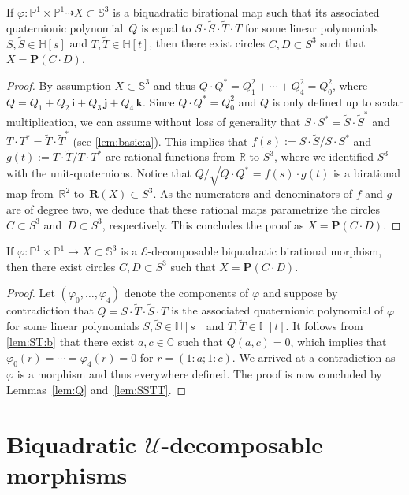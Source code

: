 \documentclass[11pt]{article}
\newcommand{\RL}[2]{\Cref{lem:#1}\ref{lem:#1:#2}}
\newcommand{\C}{\mathbb{C}}
\newcommand{\R}{\mathbb{R}}
\renewcommand{\H}{\mathbb{H}}
\renewcommand{\P}{\mathbb{P}}
\renewcommand{\S}{\mathbb{S}}
\newcommand{\bP}{\mathbf{P}}
\newcommand{\bR}{\mathbf{R}}
\newcommand{\cE}{\mathcal{E}}
\newcommand{\cU}{\mathcal{U}}
\newcommand{\tS}{\tilde{S}}
\newcommand{\tT}{\tilde{T}}
\newcommand{\qi}{\mathbf{i}}
\newcommand{\qj}{\mathbf{j}}
\newcommand{\qk}{\mathbf{k}}
\renewcommand{\c}{\colon}
\newcommand{\dto}{\dasharrow}
\newcommand{\Wlog}{without loss of generality }
\newcommand{\resp}{respectively}
\newcommand{\st}{such that }
\begin{document}
\begin{lemma}
\label{lem:SSTT}
If $\varphi\c\P^1\times\P^1\dto X\subset \S^3$ is a
biquadratic birational map \st its associated quaternionic polynomial~$Q$
is equal to $S\cdot\tS\cdot\tT\cdot T$ for some linear polynomials $S,\tS\in\H[s]$ and $T,\tT\in\H[t]$,
then there exist circles $C,D\subset S^3$ \st $X=\bP(C\cdot D)$.
\end{lemma}

\begin{proof}
By assumption $X\subset\S^3$ and thus $Q\cdot Q^*=Q_1^2+\cdots+Q_4^2=Q_0^2$,
where $Q=Q_1+Q_2\,\qi+Q_3\,\qj+Q_4\,\qk$.
Since $Q\cdot Q^*=Q_0^2$ and $Q$ is only defined up to scalar multiplication,
we can assume \Wlog that $S\cdot S^*=\tS\cdot\tS^*$ and $T\cdot T^*=\tT\cdot\tT^*$ (see \RL{basic}{a}).
This implies that $f(s):=S\cdot\tS/S\cdot S^*$ and
$g(t):=T\cdot\tT/T\cdot T^*$
are rational functions from $\R$ to $S^3$,
where we identified $S^3$ with the unit-quaternions.
Notice that $Q/\sqrt{Q\cdot Q^*}=f(s)\cdot g(t)$ is a birational map from~$\R^2$ to~$\bR(X)\subset S^3$.
As the numerators and denominators of $f$ and $g$ are of degree two,
we deduce that these rational maps parametrize the circles~$C\subset S^3$ and~$D\subset S^3$, \resp.
This concludes the proof as $X=\bP(C\cdot D)$.
\end{proof}


\begin{proposition}
\label{prp:ECD}
If $\varphi\c\P^1\times\P^1\to X\subset \S^3$
is a $\cE$-decomposable biquadratic birational morphism,
then there exist circles $C,D\subset S^3$ \st $X=\bP(C\cdot D)$.
\end{proposition}

\begin{proof}
Let $(\varphi_0,\ldots,\varphi_4)$ denote the components of $\varphi$
and suppose by contradiction that $Q=S\cdot\tT\cdot \tS\cdot T$
is the associated quaternionic polynomial of $\varphi$ for some linear polynomials
$S,\tS\in\H[s]$ and $T,\tT\in\H[t]$.
It follows from \RL{ST}{b} that there exist $a,c\in \C$
\st $Q(a,c)=0$, which implies that $\varphi_0(r)=\cdots=\varphi_4(r)=0$ for $r=(1:a;1:c)$.
We arrived at a contradiction as $\varphi$ is a morphism and thus
everywhere defined.
The proof is now concluded by Lemmas~\ref{lem:Q} and~\ref{lem:SSTT}.
\end{proof}


\section{Biquadratic \texorpdfstring{$\cU$}{U}-decomposable morphisms}
\label{sec:U}
\end{document}
